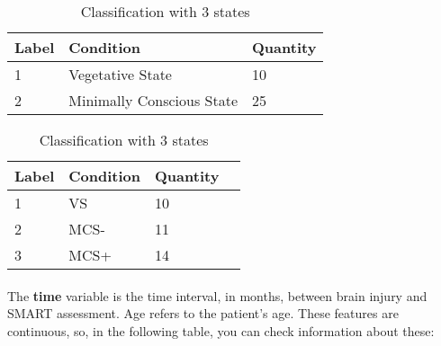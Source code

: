 \begin{table}[!htb]
    
    \begin{minipage}{.5\linewidth}
      \caption{Classification with 2 states}
      \centering
       \begin{tabular}{|l|l|l|}
\hline

Label                 & Condition     & Quantity \\ \hline
1          & Vegetative State          & 10  \\ \hline 
2 & Minimally Conscious State        & 25  \\ \hline
\end{tabular}%
\label{tab:2StatesClassification}

\label{tab:Doc2states}
    \end{minipage}%
    \begin{minipage}{.5\linewidth}
      \centering
        \caption{Classification with 3 states}
        \begin{tabular}{|l|l|l|l}
\hline
Label & Condition & Quantity \\ \hline
1       & VS      & 10  \\ \hline
2      & MCS-     & 11  \\ \hline
3      & MCS+     & 14  \\ \hline
\end{tabular}%

\label{tab:DiagnosticLabeling}
    \end{minipage} 
\end{table}
\espaco
\espaco
\espaco
\espaco
\espaco
\espaco
\espaco
\espaco
\espaco
\espaco
\espaco
\espaco
\paragraph{}The \textbf{time} variable is the time interval, in months, between brain injury and SMART assessment. Age refers to the patient's age. These features are continuous, so, in the following table, you can check information about these: 

\begin{table}[ht]
\centering
\caption{Describe Age and Time}
\label{tab:Time&Age}
\end{table}

